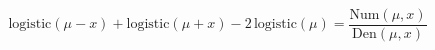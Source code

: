 \documentclass[preview]{standalone}
\begin{document}
\begin{equation}
\tag{25}
    \mathrm{logistic} ( \mu - x ) + \mathrm{logistic} ( \mu + x ) - 2 \, \mathrm{logistic} ( \mu ) = \frac{\mathrm{Num} ( \mu , x )}{\mathrm{Den} ( \mu , x )}
\end{equation}
\end{document}
